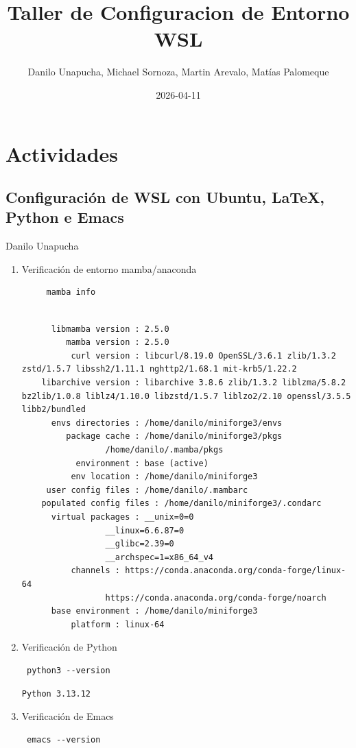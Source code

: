 \documentclass[11pt]{article}
\author{Danilo Unapucha, Michael Sornoza, Martin Arevalo, Matías Palomeque}
\date{2026-04-11}
\title{Taller de Configuracion de Entorno WSL}
\begin{document}
\maketitle
\section{Actividades}
\label{sec:orga53eeca}
\subsection{Configuración de WSL con Ubuntu, \LaTeX{}, Python e Emacs}
\label{sec:orgea3eb80}
Danilo Unapucha
\begin{enumerate}
\item Verificación de entorno mamba/anaconda
\begin{verbatim}
     mamba info
\end{verbatim}

\begin{verbatim}

	  libmamba version : 2.5.0
	     mamba version : 2.5.0
	      curl version : libcurl/8.19.0 OpenSSL/3.6.1 zlib/1.3.2 zstd/1.5.7 libssh2/1.11.1 nghttp2/1.68.1 mit-krb5/1.22.2
	libarchive version : libarchive 3.8.6 zlib/1.3.2 liblzma/5.8.2 bz2lib/1.0.8 liblz4/1.10.0 libzstd/1.5.7 liblzo2/2.10 openssl/3.5.5 libb2/bundled
	  envs directories : /home/danilo/miniforge3/envs
	     package cache : /home/danilo/miniforge3/pkgs
			     /home/danilo/.mamba/pkgs
	       environment : base (active)
	      env location : /home/danilo/miniforge3
	 user config files : /home/danilo/.mambarc
    populated config files : /home/danilo/miniforge3/.condarc
	  virtual packages : __unix=0=0
			     __linux=6.6.87=0
			     __glibc=2.39=0
			     __archspec=1=x86_64_v4
		  channels : https://conda.anaconda.org/conda-forge/linux-64
			     https://conda.anaconda.org/conda-forge/noarch
	  base environment : /home/danilo/miniforge3
		  platform : linux-64
\end{verbatim}

\item Verificación de Python
\begin{verbatim}
 python3 --version
\end{verbatim}

\begin{verbatim}
Python 3.13.12
\end{verbatim}

\item Verificación de Emacs
\begin{verbatim}
 emacs --version 
\end{verbatim}


\end{enumerate}
\end{document}
